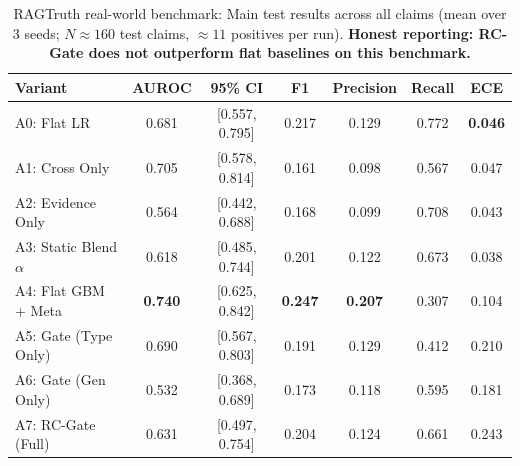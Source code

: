 \documentclass[pdflatex,sn-mathphys,Numbered]{sn-jnl}
\begin{document}
\begin{table}[htbp]
\caption{RAGTruth real-world benchmark: Main test results across all claims (mean over 3 seeds; $N \approx 160$ test claims, $\approx 11$ positives per run). \textbf{Honest reporting: RC-Gate does not outperform flat baselines on this benchmark.}}\label{tab:rag_main}
\footnotesize
\setlength{\tabcolsep}{3.5pt}
\begin{tabular}{@{}lcccccc@{}}
\toprule
\textbf{Variant} & \textbf{AUROC} & \textbf{95\% CI} & \textbf{F1} & \textbf{Precision} & \textbf{Recall} & \textbf{ECE} \\
\midrule
A0: Flat LR & 0.681 & [0.557, 0.795] & 0.217 & 0.129 & 0.772 & \textbf{0.046} \\
A1: Cross Only & 0.705 & [0.578, 0.814] & 0.161 & 0.098 & 0.567 & 0.047 \\
A2: Evidence Only & 0.564 & [0.442, 0.688] & 0.168 & 0.099 & 0.708 & 0.043 \\
A3: Static Blend $\alpha$ & 0.618 & [0.485, 0.744] & 0.201 & 0.122 & 0.673 & 0.038 \\
A4: Flat GBM + Meta & \textbf{0.740} & [0.625, 0.842] & \textbf{0.247} & \textbf{0.207} & 0.307 & 0.104 \\
A5: Gate (Type Only) & 0.690 & [0.567, 0.803] & 0.191 & 0.129 & 0.412 & 0.210 \\
A6: Gate (Gen Only) & 0.532 & [0.368, 0.689] & 0.173 & 0.118 & 0.595 & 0.181 \\
A7: RC-Gate (Full) & 0.631 & [0.497, 0.754] & 0.204 & 0.124 & 0.661 & 0.243 \\
\bottomrule
\end{tabular}
\end{table}
\end{document}
